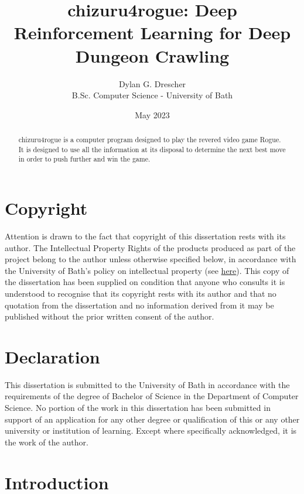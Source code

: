 \documentclass[11pt,a4paper]{article}
\begin{document}
\title{chizuru4rogue: Deep Reinforcement Learning for Deep Dungeon Crawling}
\author{Dylan G. Drescher \\[1ex] B.Sc. Computer Science - University of Bath}
\date{May 2023}
\maketitle

\begin{abstract}
    chizuru4rogue is a computer program designed to play the revered video game Rogue. It is designed to use all the information at its disposal to determine the next best move in order to push further and win the game.
\end{abstract}

\setcounter{page}{0}
\thispagestyle{empty}
\newpage

\section*{Copyright}
Attention is drawn to the fact that copyright of this dissertation rests with its author. The Intellectual Property Rights of the products produced as part of the project belong to the author unless otherwise specified below, in accordance with the University of Bath's policy on intellectual property (see \href{https://www.bath.ac.uk/publications/university-ordinances/attachments/Ordinances_1_October_2020.pdf}{here}). This copy of the dissertation has been supplied on condition that anyone who consults it is understood to recognise that its copyright rests with its author and that no quotation from the dissertation and no information derived from it may be published without the prior written consent of the author.

\section*{Declaration}
This dissertation is submitted to the University of Bath in accordance with the requirements of the degree of Bachelor of Science in the Department of Computer Science. No portion of the work in this dissertation has been submitted in support of an application for any other degree or qualification of this or any other university or institution of learning. Except where specifically acknowledged, it is the work of the author.

\newpage

\section{Introduction}
\end{document}

